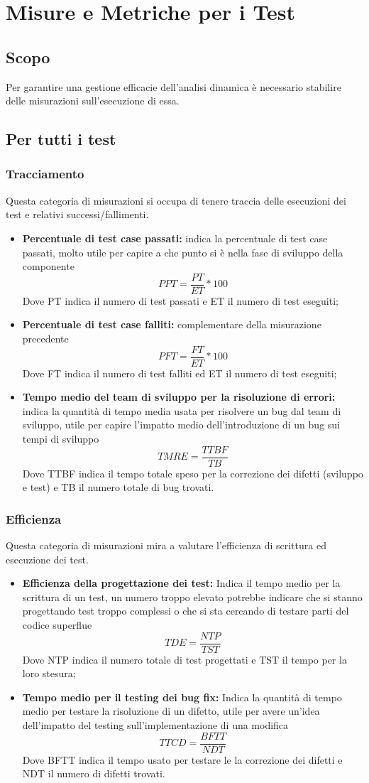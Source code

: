 \documentclass[PianoDiProgetto.tex]{subfiles}
\begin{document}
\chapter{Misure e Metriche per i Test}

\section{Scopo}
Per garantire una gestione efficacie dell'analisi dinamica è necessario stabilire delle misurazioni sull'esecuzione di essa.

\section{Per tutti i test}
\subsection{Tracciamento}
Questa categoria di misurazioni si occupa di tenere traccia delle esecuzioni dei test e relativi successi/fallimenti.
\begin{itemize}
	\item \textbf{Percentuale di test case passati:} indica la percentuale di test case passati, molto utile per capire a che punto si è nella fase di sviluppo della componente
	\[PPT=\dfrac{PT}{ET}*100\]
	Dove PT indica il numero di test passati e ET il numero di test eseguiti;
	\item \textbf{Percentuale di test case falliti:} complementare della misurazione precedente
	\[PFT=\dfrac{FT}{ET}*100\]
	Dove FT indica il numero di test falliti ed ET il numero di test eseguiti;
	\item \textbf{Tempo medio del team di sviluppo per la risoluzione di errori:} indica la quantità di tempo media usata per risolvere un bug dal team di sviluppo, utile per capire l'impatto medio dell'introduzione di un bug sui tempi di sviluppo
	\[TMRE=\dfrac{TTBF}{TB}\]
	Dove TTBF indica il tempo totale speso per la correzione dei difetti (sviluppo e test) e TB il numero totale di bug trovati.
\end{itemize}
\subsection{Efficienza}
Questa categoria di misurazioni mira a valutare l'efficienza di scrittura ed esecuzione dei test.
\begin{itemize}
	\item \textbf{Efficienza della progettazione dei test:} Indica il tempo medio per la scrittura di un test, un numero troppo elevato potrebbe indicare che si stanno progettando test troppo complessi o che si sta cercando di testare parti del codice superflue
	\[TDE=\dfrac{NTP}{TST}\]
	Dove NTP indica il numero totale di test progettati e TST il tempo per la loro stesura;
	\item \textbf{Tempo medio per il testing dei bug fix:} Indica la quantità di tempo medio per testare la risoluzione di un difetto, utile per avere un'idea dell'impatto del testing sull'implementazione di una modifica
	\[TTCD=\dfrac{BFTT}{NDT}\]
	Dove BFTT indica il tempo usato per testare le la correzione dei difetti e NDT il numero di difetti trovati.
\end{itemize}
\end{document}
